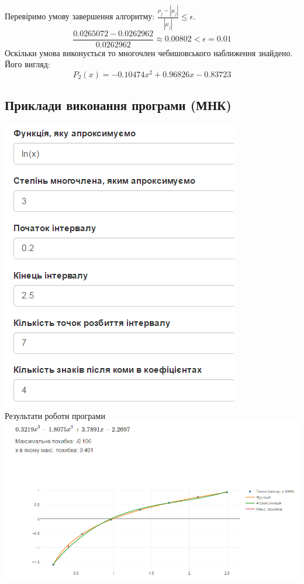 \documentclass[ukrainian,14pt]{extarticle}
\begin{document}
Перевіримо умову завершення алгоритму: $\frac{\rho_j - |\mu_j|}{|\mu_j|} \leq \epsilon.$ \\

$$\frac{0.0265072 - 0.0262962}{0.0262962} \approx 0.00802 < \epsilon = 0.01$$
Оскільки умова виконується  то многочлен чебишовського наближення знайдено. Його вигляд:\\
$$P_2(x) = -0.10474 x^{2} + 0.96826x - 0.83723$$


\newpage
\subsection{Приклади виконання програми (МНК)}
\includegraphics[scale=0.7]{form} \\
Результати роботи програми \\
\includegraphics[scale=0.7]{res}
\end{document}
